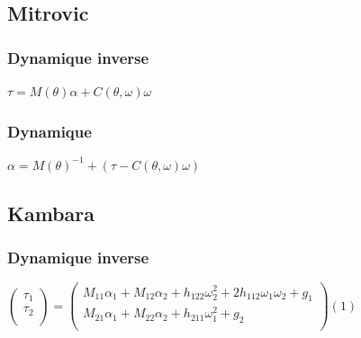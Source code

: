 \documentclass[pdftex,a4paper,11pt]{article}
\begin{document}

\subsection{Mitrovic}

\subsubsection{Dynamique inverse}
$\tau = M(\theta)\alpha + C(\theta, \omega) \omega $

\subsubsection{Dynamique}
$\alpha = M(\theta)^{-1} + (\tau - C(\theta, \omega) \omega) $


\subsection{Kambara}

\subsubsection{Dynamique inverse}
$
\begin{pmatrix}
    \tau_1 \\
    \tau_2 \\
\end{pmatrix}
=
\begin{pmatrix}
    M_{11}\alpha_1 + M_{12}\alpha_2 + h_{122}\omega_2^2 + 2h_{112}\omega_1\omega_2 + g_1 \\
    M_{21}\alpha_1 + M_{22}\alpha_2 + h_{211}\omega_1^2 + g_2 \\
\end{pmatrix}
(1)$
\end{document}
